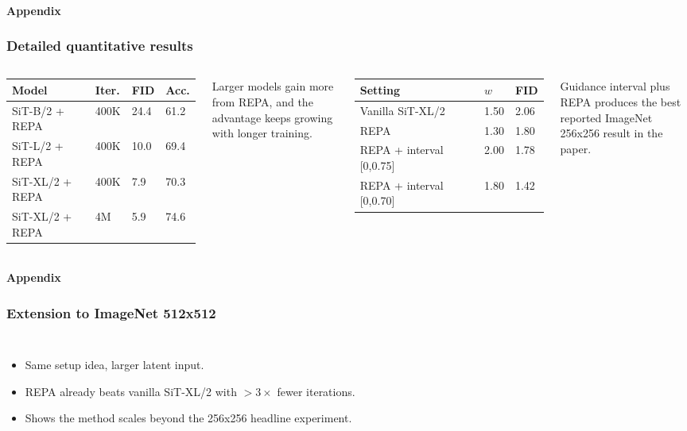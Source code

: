 \begin{frame}[t]
  \framesubtitle{Appendix}
  \frametitle{Detailed quantitative results}
  \begin{columns}[T,totalwidth=\textwidth]
    \begin{tabular}{L{2.1cm}C{1.0cm}C{0.9cm}C{1.0cm}}
      \toprule
      Model & Iter. & FID & Acc. \\
      \midrule
      SiT-B/2 + REPA & 400K & 24.4 & 61.2 \\
      SiT-L/2 + REPA & 400K & 10.0 & 69.4 \\
      SiT-XL/2 + REPA & 400K & 7.9 & 70.3 \\
      SiT-XL/2 + REPA & 4M & 5.9 & 74.6 \\
      \bottomrule
    \end{tabular}
    \vspace{0.16cm}
    {\small Larger models gain more from REPA, and the advantage keeps growing with longer training.}
    \begin{tabular}{L{2.5cm}C{0.8cm}C{0.9cm}}
      \toprule
      Setting & \(w\) & FID \\
      \midrule
      Vanilla SiT-XL/2 & 1.50 & 2.06 \\
      REPA & 1.30 & 1.80 \\
      REPA + interval [0,0.75] & 2.00 & 1.78 \\
      REPA + interval [0,0.70] & 1.80 & 1.42 \\
      \bottomrule
    \end{tabular}
    \vspace{0.16cm}
    {\small Guidance interval plus REPA produces the best reported ImageNet 256x256 result in the paper.}
  \end{columns}
\end{frame}

\begin{frame}[t]
  \framesubtitle{Appendix}
  \frametitle{Extension to ImageNet 512x512}
  \begin{columns}[T,totalwidth=\textwidth]
    \AppFiveTwelve[width=\linewidth]
    \begin{itemize}
      \item Same setup idea, larger latent input.
      \item REPA already beats vanilla SiT-XL/2 with \(>3\times\) fewer iterations.
      \item Shows the method scales beyond the 256x256 headline experiment.
    \end{itemize}
  \end{columns}
\end{frame}

